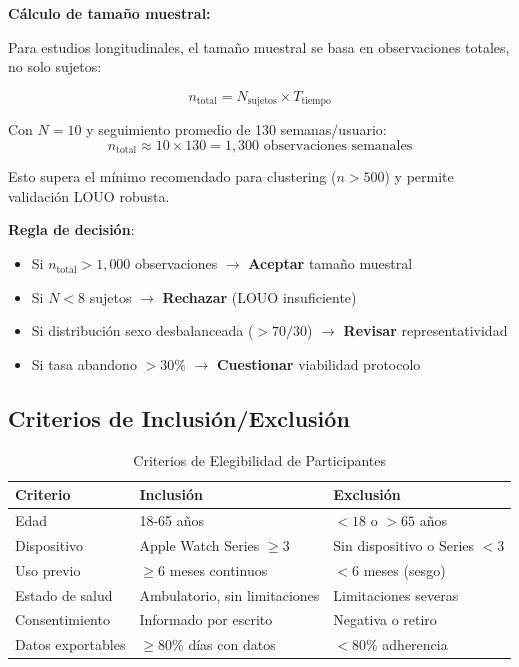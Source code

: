 \documentclass[12pt,letterpaper,twoside]{report}
\begin{document}
\begin{estadisticobox}
\textbf{Cálculo de tamaño muestral:}

Para estudios longitudinales, el tamaño muestral se basa en observaciones totales, no solo sujetos:

\begin{equation}
n_{\text{total}} = N_{\text{sujetos}} \times T_{\text{tiempo}}
\end{equation}

Con $N=10$ y seguimiento promedio de 130 semanas/usuario:
\begin{equation}
n_{\text{total}} \approx 10 \times 130 = 1,300 \text{ observaciones semanales}
\end{equation}

Esto supera el mínimo recomendado para clustering ($n > 500$) y permite validación LOUO robusta.
\end{estadisticobox}

\begin{reglabox}
\textbf{Regla de decisión}:

\begin{itemize}[noitemsep]
    \item Si $n_{\text{total}} > 1,000$ observaciones $\to$ \textbf{Aceptar} tamaño muestral
    \item Si $N < 8$ sujetos $\to$ \textbf{Rechazar} (LOUO insuficiente)
    \item Si distribución sexo desbalanceada ($> 70/30$) $\to$ \textbf{Revisar} representatividad
    \item Si tasa abandono $> 30\%$ $\to$ \textbf{Cuestionar} viabilidad protocolo
\end{itemize}
\end{reglabox}

\subsection{Criterios de Inclusión/Exclusión}

\begin{table}[htbp]
\centering
\caption{Criterios de Elegibilidad de Participantes}
\label{tab:eligibility}
\small
\begin{tabular}{lll}
\toprule
\textbf{Criterio} & \textbf{Inclusión} & \textbf{Exclusión} \\
\midrule
Edad & 18-65 años & $<18$ o $>65$ años \\
Dispositivo & Apple Watch Series $\geq 3$ & Sin dispositivo o Series $<3$ \\
Uso previo & $\geq 6$ meses continuos & $<6$ meses (sesgo) \\
Estado de salud & Ambulatorio, sin limitaciones & Limitaciones severas \\
Consentimiento & Informado por escrito & Negativa o retiro \\
Datos exportables & $\geq 80\%$ días con datos & $<80\%$ adherencia \\
\bottomrule
\end{tabular}
\end{table}
\end{document}
